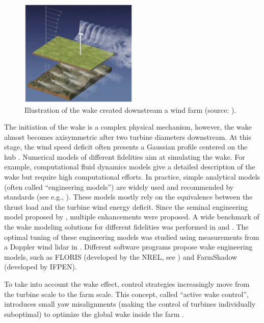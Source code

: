 \begin{figure}%
    \centering
    \includegraphics[width=0.5\textwidth]{./part1/figures/wake.png}
    \caption{Illustration of the wake created downstream a wind farm (source: \citealp{veers_2019_review}).} 
    \label{fig:wake_illustration}
\end{figure}

The initiation of the wake is a complex physical mechanism, however, the wake almost becomes axisymmetric after two turbine diameters downstream. 
At this stage, the wind speed deficit often presents a Gaussian profile centered on the hub \citep{burton_2021_wind_handbook}. 
Numerical models of different fidelities aim at simulating the wake. 
For example, computational fluid dynamics models give a detailed description of the wake but require high computational efforts. 
In practice, simple analytical models (often called ``engineering models'') are widely used and recommended by standards (see e.g., \citealp[Appendix E]{iec_2019}). 
These models mostly rely on the equivalence between the thrust load and the turbine wind energy deficit. 
Since the seminal engineering model proposed by \citet{jensen_1983_wake}, multiple enhancements were proposed. 
A wide benchmark of the wake modeling solutions for different fidelities was performed in \citet{doubrawa_2020_benchmark} and \citet{hiperwind_2023_wp3}. 
The optimal tuning of these engineering models was studied using measurements from a Doppler wind lidar in \citet{zhan_2020_optimal_wake}. 
Different software programs propose wake engineering models, such as FLORIS (developed by the NREL, see \citealp{fleming_2020_FLORIS}) and FarmShadow (developed by IFPEN\footnotemark). 


To take into account the wake effect, control strategies increasingly move from the turbine scale to the farm scale. 
This concept, called ``active wake control'', introduces small yaw misalignments (making the control of turbines individually suboptimal) to optimize the global wake inside the farm \citep{rott_2018_active_control,simley_2020_active_control,meyers_2022_active_control}. 



